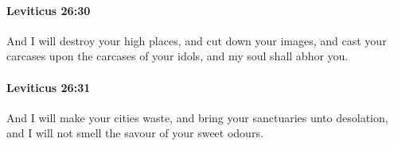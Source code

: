 		\paragraph{Leviticus 26:30} %
			\label{LEVITICUS-26-30}

			And I will destroy your high places, and cut down your images, and cast your carcases upon the carcases of your idols, and my soul shall abhor you.


		\paragraph{Leviticus 26:31} %
			\label{LEVITICUS-26-31}

			And I will make your cities waste, and bring your sanctuaries unto desolation, and I will not smell the savour of your sweet odours.


